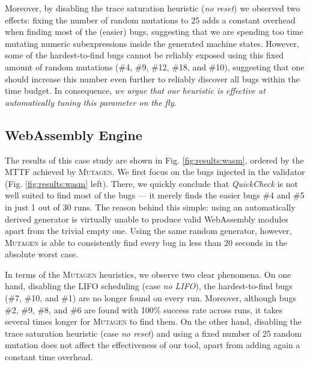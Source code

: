 \documentclass[sigconf,review,anonymous]{acmart}
\newcommand{\quickcheck}{\textit{QuickCheck}\xspace}
\newcommand{\mutagen}{\textsc{Mutagen}\xspace}
\begin{document}
Moreover, by disabling the trace saturation heuristic (\textit{no reset}) we
observed two effects:
%
fixing the number of random mutations to 25 adds a constant overhead when
finding most of the (easier) bugs, suggesting that we are spending too time
mutating numeric subexpressions inside the generated machine states.
%
%
However, some of the hardest-to-find bugs cannot be reliably exposed using this
fixed amount of random mutations (\#4, \#9, \#12, \#18, and \#10), suggesting
that one should increase this number even further to reliably discover all bugs
within the time budget.
%
In consequence, \emph{we argue that our heuristic is effective at automatically
tuning this parameter on the fly}.
%


\subsection{WebAssembly Engine}

The results of this case study are shown in Fig. \ref{fig:results:wasm}, ordered
by the MTTF achieved by \mutagen.
%
We first focus on the bugs injected in the validator (Fig.
\ref{fig:results:wasm} left).
%
There, we quickly conclude that \quickcheck is not well suited to find most of
the bugs --- it merely finds the easier bugs \#4 and \#5 in just 1 out of 30
runs.
%
The reason behind this simple:
%
%
using an automatically derived generator is virtually unable to produce valid
WebAssembly modules apart from the trivial empty one.
%
Using the same random generator, however, \mutagen is able to consistently find
every bug in less than 20 seconds in the absolute worst case.


In terms of the \mutagen heuristics, we observe two clear phenomena.
%
On one hand, disabling the LIFO scheduling (case \textit{no LIFO}), the
hardest-to-find bugs (\#7, \#10, and \#1) are no longer found on every run.
%
Moreover, although bugs \#2, \#9, \#8, and \#6 are found with 100\% success rate
across runs, it takes several times longer for \mutagen to find them.
%
On the other hand, disabling the trace saturation heuristic (case \textit{no
  reset}) and using a fixed number of 25 random mutation does not affect the
effectiveness of our tool, apart from adding again a constant time overhead.
\end{document}
